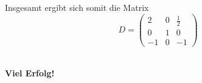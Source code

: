 \documentclass[a4paper,11pt]{scrartcl}
\begin{document}
\begin{enumerate}[a)]
\begin{enumerate}[i)]
\end{enumerate}
Insgesamt ergibt sich somit die Matrix
$$
D=\begin{pmatrix} 2 & 0 & \frac{1}{2} \\ 0 & 1 & 0 \\ -1 & 0 &-1 \end{pmatrix}
$$
\end{enumerate}

\quad\\

\vfill \hfill \textbf{Viel Erfolg!}
\end{document}
